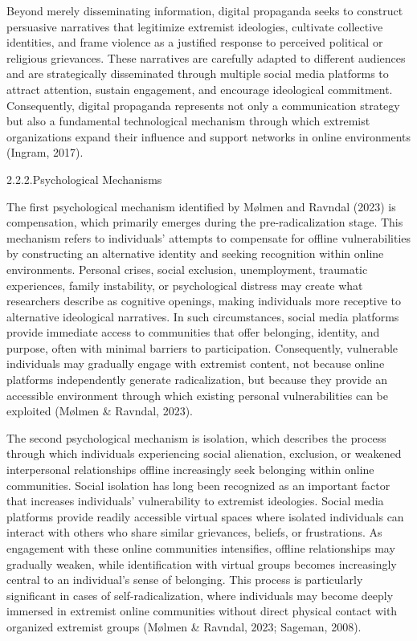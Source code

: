 \documentclass{NSP1}
\begin{document}
Beyond merely disseminating information, digital propaganda seeks to construct persuasive narratives that legitimize extremist ideologies, cultivate collective identities, and frame violence as a justified response to perceived political or religious grievances. These narratives are carefully adapted to different audiences and are strategically disseminated through multiple social media platforms to attract attention, sustain engagement, and encourage ideological commitment. Consequently, digital propaganda represents not only a communication strategy but also a fundamental technological mechanism through which extremist organizations expand their influence and support networks in online environments (Ingram, 2017).

2.2.2.Psychological Mechanisms

\par\medskip{}\smallskip

The first psychological mechanism identified by Mølmen and Ravndal (2023) is compensation, which primarily emerges during the pre-radicalization stage. This mechanism refers to individuals' attempts to compensate for offline vulnerabilities by constructing an alternative identity and seeking recognition within online environments. Personal crises, social exclusion, unemployment, traumatic experiences, family instability, or psychological distress may create what researchers describe as cognitive openings, making individuals more receptive to alternative ideological narratives. In such circumstances, social media platforms provide immediate access to communities that offer belonging, identity, and purpose, often with minimal barriers to participation. Consequently, vulnerable individuals may gradually engage with extremist content, not because online platforms independently generate radicalization, but because they provide an accessible environment through which existing personal vulnerabilities can be exploited (Mølmen \& Ravndal, 2023).

\par\medskip{}\smallskip

The second psychological mechanism is isolation, which describes the process through which individuals experiencing social alienation, exclusion, or weakened interpersonal relationships offline increasingly seek belonging within online communities. Social isolation has long been recognized as an important factor that increases individuals' vulnerability to extremist ideologies. Social media platforms provide readily accessible virtual spaces where isolated individuals can interact with others who share similar grievances, beliefs, or frustrations. As engagement with these online communities intensifies, offline relationships may gradually weaken, while identification with virtual groups becomes increasingly central to an individual's sense of belonging. This process is particularly significant in cases of self-radicalization, where individuals may become deeply immersed in extremist online communities without direct physical contact with organized extremist groups (Mølmen \& Ravndal, 2023; Sageman, 2008).
\end{document}
